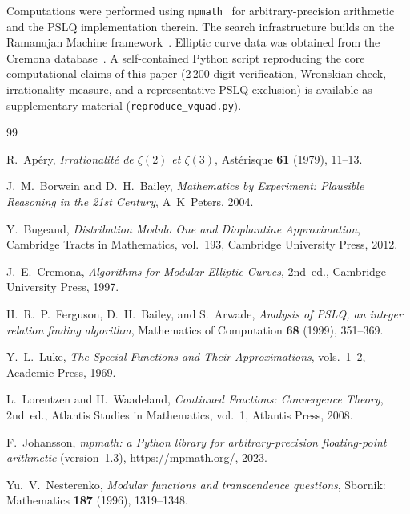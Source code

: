 \documentclass[11pt,a4paper]{article}
\theoremstyle{definition}
\theoremstyle{remark}
\begin{document}
Computations were performed using \texttt{mpmath}~\cite{mpmath}
for arbitrary-precision arithmetic and the PSLQ implementation
therein.  The search infrastructure builds on the Ramanujan Machine
framework~\cite{raayoni2021}.
Elliptic curve data was obtained from the Cremona
database~\cite{cremona1997}.
A self-contained Python script reproducing the core computational
claims of this paper (2\,200-digit verification, Wronskian check,
irrationality measure, and a representative PSLQ exclusion) is
available as supplementary material (\texttt{reproduce\_vquad.py}).


\begin{thebibliography}{99}

R.~Ap\'ery,
\emph{Irrationalit\'e de $\zeta(2)$ et $\zeta(3)$},
Ast\'erisque \textbf{61} (1979), 11--13.

J.~M.~Borwein and D.~H.~Bailey,
\emph{Mathematics by Experiment: Plausible Reasoning in the 21st Century},
A~K~Peters, 2004.

Y.~Bugeaud,
\emph{Distribution Modulo One and Diophantine Approximation},
Cambridge Tracts in Mathematics, vol.~193,
Cambridge University Press, 2012.

J.~E.~Cremona,
\emph{Algorithms for Modular Elliptic Curves}, 2nd~ed.,
Cambridge University Press, 1997.

H.~R.~P.~Ferguson, D.~H.~Bailey, and S.~Arwade,
\emph{Analysis of PSLQ, an integer relation finding algorithm},
Mathematics of Computation \textbf{68} (1999), 351--369.

Y.~L.~Luke,
\emph{The Special Functions and Their Approximations}, vols.~1--2,
Academic Press, 1969.

L.~Lorentzen and H.~Waadeland,
\emph{Continued Fractions: Convergence Theory}, 2nd~ed.,
Atlantis Studies in Mathematics, vol.~1,
Atlantis Press, 2008.

F.~Johansson,
\emph{mpmath: a Python library for arbitrary-precision floating-point
arithmetic} (version~1.3),
\url{https://mpmath.org/}, 2023.

Yu.~V.~Nesterenko,
\emph{Modular functions and transcendence questions},
Sbornik: Mathematics \textbf{187} (1996), 1319--1348.


\end{thebibliography}
\end{document}
